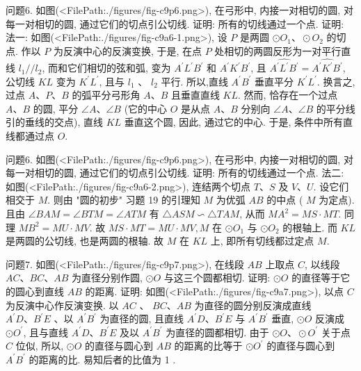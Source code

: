 问题6. 如图(<FilePath:./figures/fig-c9p6.png>), 在弓形中, 内接一对相切的圆, 对每一对相切的圆, 通过它们的切点引公切线.
证明: 所有的切线通过一个点.
证明: 法一: 如图(<FilePath:./figures/fig-c9a6-1.png>), 设 $P$ 是两圆 $\odot O_1 、 \odot O_2$ 的切点.
作以 $P$ 为反演中心的反演变换, 于是, 在点 $P$ 处相切的两圆反形为一对平行直线 $l_1 / / l_2$, 而和它们相切的弦和弧, 变为 $A^{\prime} L^{\prime} B^{\prime}$ 和 $A^{\prime} K^{\prime} B^{\prime}$, 且 $\widehat{A^{\prime} L^{\prime} B^{\prime}}=\widehat{A^{\prime} K^{\prime} B^{\prime}}$, 公切线 $K L$ 变为 $K^{\prime} L^{\prime}$, 且与 $l_1$ 、 $l_2$ 平行.
所以,直线 $A^{\prime} B^{\prime}$ 垂直平分 $K^{\prime} L^{\prime}$. 换言之, 过点 $A 、 P 、 B$ 的弧平分弓形角 $A 、 B$ 且垂直直线 $K L$. 然而, 恰存在一个过点 $A 、 B$ 的圆, 平分 $\angle A 、 \angle B$ (它的中心 $O$ 是从点 $A 、 B$ 分别向 $\angle A 、 \angle B$ 的平分线引的垂线的交点), 直线 $K L$ 垂直这个圆, 因此, 通过它的中心.
于是, 条件中所有直线都通过点 $O$.



问题6. 如图(<FilePath:./figures/fig-c9p6.png>), 在弓形中, 内接一对相切的圆, 对每一对相切的圆, 通过它们的切点引公切线.
证明: 所有的切线通过一个点.
法二: 如图(<FilePath:./figures/fig-c9a6-2.png>), 连结两个切点 $T 、 S$ 及 $V 、 U$. 设它们相交于 $M$. 则由 "圆的初步" 习题 19 的引理知 $M$ 为优弧 $A B$ 的中点 ( $M$ 为定点). 且由 $\angle B A M=\angle B T M= \angle A T M$ 有 $\triangle A S M \backsim \triangle T A M$, 从而 $M A^2=M S \cdot M T$. 同理 $M B^2=M U \cdot M V$. 故 $M S \cdot M T=M U \cdot M V, M$ 在 $\odot O_1$ 与 $\odot O_2$ 的根轴上.
而 $K L$ 是两圆的公切线, 也是两圆的根轴.
故 $M$ 在 $K L$ 上, 即所有切线都过定点 $M$.



问题7. 如图(<FilePath:./figures/fig-c9p7.png>), 在线段 $A B$ 上取点 $C$, 以线段 $A C 、 B C 、 A B$ 为直径分别作圆, $\odot O$ 与这三个圆都相切.
证明: $\odot O$ 的直径等于它的圆心到直线 $A B$ 的距离.
证明: 如图(<FilePath:./figures/fig-c9a7.png>), 以点 $C$ 为反演中心作反演变换.
以 $A C$ 、 $B C 、 A B$ 为直径的圆分别反演成直线 $A^{\prime} D 、 B^{\prime} E$ 、以 $A^{\prime} B^{\prime}$ 为直径的圆, 且直线 $A^{\prime} D 、 B^{\prime} E$ 与 $A^{\prime} B^{\prime}$ 垂直, $\odot O$ 反演成 $\odot O^{\prime}$, 且与直线 $A^{\prime} D 、 B^{\prime} E$ 及以 $A^{\prime} B^{\prime}$ 为直径的圆都相切.
由于 $\odot O 、 \odot O^{\prime}$ 关于点 $C$ 位似, 所以, $\odot O$ 的直径与圆心到 $A B$ 的距离的比等于 $\odot O^{\prime}$ 的直径与圆心到 $A^{\prime} B^{\prime}$ 的距离的比.
易知后者的比值为 1 .



